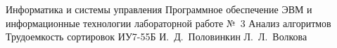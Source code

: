 \makereporttitle
{Информатика и системы управления} %
{Программное обеспечение ЭВМ и информационные технологии} %
{лабораторной работе №~3} %
{Анализ алгоритмов} %
{Трудоемкость сортировок} %
{}
{ИУ7-55Б}
{И.~Д.~Половинкин} %
{Л.~Л.~Волкова}
